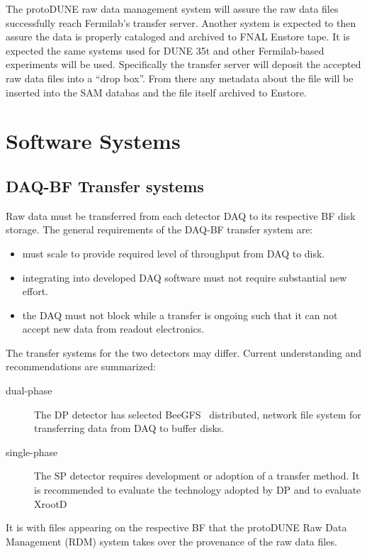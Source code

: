 \documentclass[pdftex,12pt,letter]{article}
\begin{document}
The protoDUNE raw data management system will assure the raw data
files successfully reach Fermilab's transfer server.  Another system
is expected to then assure the data is properly cataloged and archived
to FNAL Enstore tape.  It is expected the same systems used for DUNE
35t and other Fermilab-based experiments will be used.  Specifically
the transfer server will deposit the accepted raw data files into a
``drop box''.  From there any metadata about the file will be inserted
into the SAM databas and the file itself archived to Enstore.

\section{Software Systems}

\subsection{DAQ-BF Transfer systems}

Raw data must be transferred from each detector DAQ to its respective
BF disk storage.  The general requirements of the DAQ-BF transfer
system are:

\begin{itemize}
\item must scale to provide required level of throughput from DAQ to disk.
\item integrating into developed DAQ software must not require
  substantial new effort.
\item the DAQ must not block while a transfer is ongoing such that it
  can not accept new data from readout electronics.
\end{itemize}

The transfer systems for the two detectors may differ.  Current
understanding and recommendations are summarized:

\begin{description}
\item[dual-phase] The DP detector has selected BeeGFS~\cite{beegfs}
  distributed, network file system for transferring data from DAQ to
  buffer disks.  

\item[single-phase] The SP detector requires development or adoption
  of a transfer method.  It is recommended to evaluate the technology
  adopted by DP and to evaluate XrootD~\cite{xrootd}
\end{description}

It is with files appearing on the respective BF that the protoDUNE Raw
Data Management (RDM) system takes over the provenance of the raw data
files.
\end{document}
